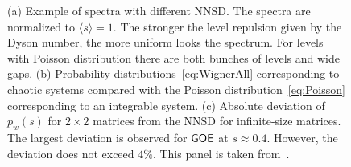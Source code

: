 \documentclass[a4paper,11pt,twoside]{article}
\begin{document}
            \begin{figure}[!htbp]
                \begin{subfigure}{0.55\linewidth}
                    \centering{}
                \end{subfigure}
                \hfill
                \begin{subfigure}{0.44\linewidth}
                    \centering{}
                    \centering{}
                \end{subfigure}
                \caption{
                    \protect\small
                    (a) Example of spectra with different NNSD.
                    The spectra are normalized to $\langle s\rangle=1$.
                    The stronger the level repulsion given by the Dyson number,
                    the more uniform looks the spectrum.
                    For levels with Poisson distribution there are both bunches of levels and wide gaps.
                    (b) Probability distributions~\eqref{eq:WignerAll} corresponding to chaotic systems compared with the Poisson distribution~\eqref{eq:Poisson} corresponding to an integrable system.
                    (c) Absolute deviation of $p_{w}(s)$ for $2\times2$ matrices from the NNSD for infinite-size matrices.
                    The largest deviation is observed for $\mathsf{GOE}$ at $s\approx0.4$.
                    However, the deviation does not exceed $4\%$.
                    This panel is taken from~\cite{Haa10}.
                }	
                \label{fig:Ensembles}
            \end{figure}
\end{document}
